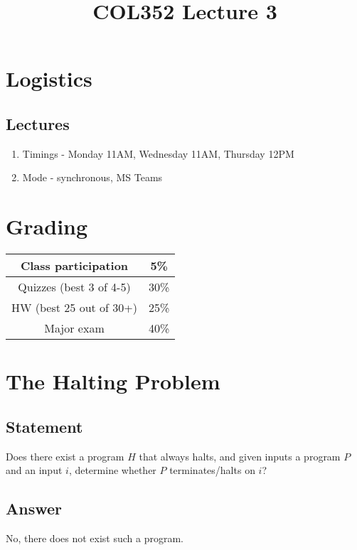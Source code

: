 \documentclass[a4paper]{article}
\title{\textbf{COL352 Lecture 3}}
\date{}
\begin{document}
\maketitle
\tableofcontents

\iffalse

\section{Logistics}
\subsection{Lectures}
\begin{enumerate}
    \item Timings - Monday 11AM, Wednesday 11AM, Thursday 12PM
    \item Mode - synchronous, MS Teams
\end{enumerate}
\section{Grading}
\begin{center}
\begin{tabular}{|c|c|}
    \hline
    Class participation     &  5\% \\
    \hline
    Quizzes (best 3 of 4-5) & 30\% \\
    \hline
    HW (best 25 out of 30+) & 25\% \\
    \hline
    Major exam	            & 40\% \\
    \hline
\end{tabular}
\end{center}
\section{The Halting Problem}
\subsection{Statement}
Does there exist a program $H$ that always halts, and given inputs a program $P$ and an input $i$, determine whether $P$ terminates/halts on $i$?
\subsection{Answer}
No, there does not exist such a program.
\end{document}
